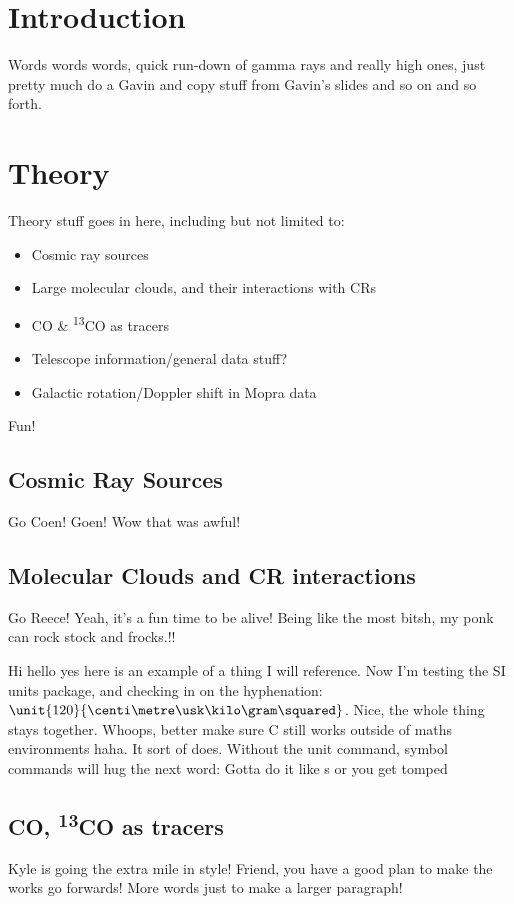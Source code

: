 \documentclass[a4paper, titlepage, oneside]{article}
\newcommand{\elem}[2]{\textsuperscript{#1}{#2}}
\begin{document}
\begin{multicols}{2}
\section{Introduction}
Words words words, quick run-down of gamma rays and really high ones, just pretty much do a Gavin and copy stuff from Gavin's slides and so on and so forth.

\section{Theory}
Theory stuff goes in here, including but not limited to:
\begin{itemize}
\item Cosmic ray sources
\item Large molecular clouds, and their interactions with CRs
\item CO \& \elem{13}{CO} as tracers
\item Telescope information/general data stuff?
\item Galactic rotation/Doppler shift in Mopra data
\end{itemize}
Fun!

\subsection{Cosmic Ray Sources}
Go Coen! Goen! Wow that was awful!

\subsection{Molecular Clouds and CR interactions}
Go Reece!  Yeah, it's a fun time to be alive! Being like the most bitsh, my ponk can rock stock and frocks.!!

Hi hello yes here is an example of a thing I will reference. \parencite{rmp1} Now I'm testing the SI units package, and checking in on the hyphenation: \(\unit{120}{\centi\metre\usk\kilo\gram\squared}\). Nice, the whole thing stays together. Whoops, better make sure \degree C still works outside of maths environments haha. It sort of does. Without the unit command, symbol commands will hug the next word: Gotta do it like \unit{\second} or you get \second tomped

\subsection{CO, \elem{13}{CO} as tracers}
Kyle is going the extra mile in style! Friend, you have a good plan to make the works go forwards! More words just to make a larger paragraph!


\end{multicols}
\end{document}
